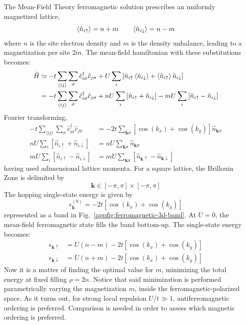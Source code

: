 The Mean-Field Theory ferromagnetic solution prescribes an uniformly magnetized lattice,
\[
	\ev{\hat n_{i\uparrow}} = n+m
	\qquad
	\ev{\hat n_{i\downarrow}} = n-m
\]
where $n$ is the site electron density and $m$ is the density unbalance, leading to a magnetization per site $2m$. The mean-field hamiltonian with these substitutions becomes:
\[
\begin{aligned}
	\hat H &\simeq 
	-t \sum_{\langle ij \rangle} \sum_\sigma \hat c_{i\sigma}^\dagger \hat c_{j\sigma}
	+ U \sum_i \left[
		\hat n_{i\uparrow} \ev{\hat n_{i\downarrow}} + \ev{\hat n_{i\uparrow}} \hat n_{i\downarrow} 
	\right] \\
	&= -t \sum_{\langle ij \rangle} \sum_\sigma \hat c_{i\sigma}^\dagger \hat c_{j\sigma}
	+ nU \sum_i \left[
		\hat n_{i\uparrow} + \hat n_{i\downarrow} 
	\right] - mU \sum_i \left[
		\hat n_{i\uparrow} - \hat n_{i\downarrow} 
	\right]
\end{aligned}
\]
Fourier transforming,
\[
\begin{aligned}
	-t \sum_{\langle ij \rangle} \sum_\sigma \hat c_{i\sigma}^\dagger \hat c_{j\sigma} &= -2t \sum_{\mathbf{k}\sigma} \left[
		\cos(k_x) + \cos(k_y)
	\right] \hat n_{\mathbf{k}\sigma} \\
	nU \sum_i \left[
		\hat n_{i\uparrow} + \hat n_{i\downarrow} 
	\right] &= nU \sum_{\mathbf{k}\sigma} \hat n_{\mathbf{k}\sigma} \\
	mU \sum_i \left[
		\hat n_{i\uparrow} - \hat n_{i\downarrow} 
	\right] &= mU \sum_{\mathbf{k}\sigma} \left[
		\hat n_{\mathbf{k}\uparrow} - \hat n_{\mathbf{k}\downarrow}
	\right]
\end{aligned}
\]
having used adimensional lattice momenta. For a square lattice, the Brillouin Zone is delimited by
\[
	\mathbf{k} \in [-\pi,\pi] \times [-\pi,\pi]
\]
The hopping single-state energy is given by
\[
	\epsilon_{\mathbf{k}}^{(0)} = -2t \left[
		\cos(k_x) + \cos(k_y)
	\right]
\]
represented as a band in Fig.~\ref{appfig:ferromagnetic-3d-band}. At $U=0$, the mean-field ferromagnetic state fills the band bottom-up. The single-state energy becomes:
\[
\begin{aligned}
	\epsilon_{\mathbf{k}\uparrow} &= U \left(
		n-m
	\right) - 2t \left[
		\cos(k_x) + \cos(k_y)
	\right] \\
	\epsilon_{\mathbf{k}\downarrow} &= U \left(
		n+m
	\right) - 2t \left[
		\cos(k_x) + \cos(k_y)
	\right]
\end{aligned}
\]
Now it is a matter of finding the optimal value for $m$, minimizing the total energy at fixed filling $\rho = 2n$. Notice that said minimization is performed parametrically varying the magnetization $m$, inside the ferromagnetic-polarized space. As it turns out, for strong local repulsion $U/t \gg 1$, antiferromagnetic ordering is preferred. Comparison is needed in order to assess which magnetic ordering is preferred.

